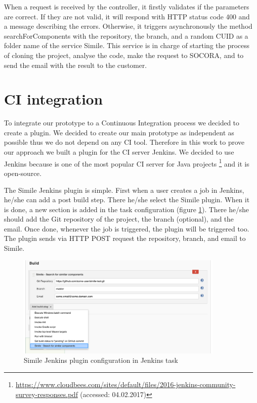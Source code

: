 When a request is received by the controller, it firstly validates if the parameters are correct. If they are not valid, it will respond with HTTP status code 400 and a message describing the errors. Otherwise, it triggers asynchronously the method searchForComponents with the repository, the branch, and a random CUID as a folder name of the service Simile. This service is in charge of starting the process of cloning the project, analyse the code, make the request to SOCORA, and to send the email with the result to the customer.

\section{CI integration}
\label{ci-integration}
To integrate our prototype to a Continuous Integration process we decided to create a plugin. We decided to create our main prototype as independent as possible thus we do not depend on any CI tool. Therefore in this work to prove our approach we built a plugin for the CI server Jenkins. We decided to use Jenkins because is one of the most popular CI server for Java projects \footnote{\url{https://www.cloudbees.com/sites/default/files/2016-jenkins-community-survey-responses.pdf} (accessed: 04.02.2017)} and it is open-source.

The Simile Jenkins plugin is simple. First when a user creates a job in Jenkins, he/she can add a post build step. There he/she select the Simile plugin. When it is done, a new section is added in the task configuration (figure \ref{fig:simile-conf-01}). There he/she should add the Git repository of the project, the branch (optional), and the email. Once done, whenever the job is triggered, the plugin will be triggered too. The plugin sends via HTTP POST request the repository, branch, and email to Simile.

\begin{figure}[H]
	\centering
    \includegraphics[width=0.9\textwidth]{grafiken/simile-conf-01}
    \caption{Simile Jenkins plugin configuration in Jenkins task}
    \label{fig:simile-conf-01}
\end{figure}

